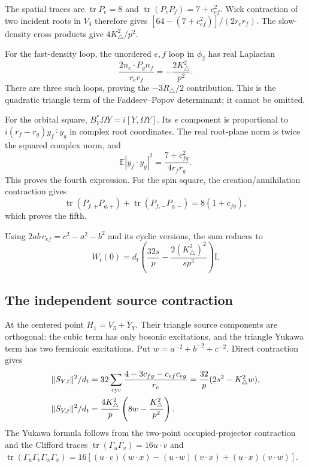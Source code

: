 \documentclass[11pt,letterpaper]{article}
\newcommand{\tr}{\operatorname{tr}}
\newcommand{\E}{\mathbb E}
\newcommand{\Id}{\mathrm I}
\begin{document}
The spatial traces are $\tr P_e=8$ and $\tr(P_eP_f)=7+c_{ef}^2$. Wick contraction of two incident roots in $V_4$ therefore gives
$[64-(7+c_{ef}^2)]/(2r_er_f)$. The slow-density cross products give $4K_\triangle^2/p^2$.

For the fast-density loop, the unordered $e,f$ loop in $\phi_2$ has real Laplacian
\[
 \frac{2n_e\cdot P_gn_f}{r_er_f}=-\frac{2K_\triangle^2}{p^2}.
\]
There are three such loops, proving the $-3R_\triangle/2$ contribution. This is the quadratic triangle term of the Faddeev--Popov determinant; it cannot be omitted.

For the orbital square, $B_Y^*\Omega Y=i[Y,\Omega Y]$. Its $e$ component is proportional to $i(r_f-r_g)\overline{y_f\cdot y_g}$ in complex root coordinates. The real root-plane norm is twice the squared complex norm, and
\[
 \E|y_f\cdot y_g|^2=\frac{7+c_{fg}^2}{4r_fr_g}.
\]
This proves the fourth expression. For the spin square, the creation/annihilation contraction gives
\[
 \tr(P_{f,+}P_{g,+})+\tr(P_{f,-}P_{g,-})=8(1+c_{fg}),
\]
which proves the fifth.

Using $2ab\,c_{ef}=c^2-a^2-b^2$ and its cyclic versions, the sum reduces to
\begin{equation}
 \boxed{\quad W_t(0)=d_t\left(\frac{32s}{p}
          -\frac{2(K_\triangle^2)^2}{s p^3}\right)\Id.\quad} \label{eq:Wt}
\end{equation}

\subsection{The independent source contraction}
At the centered point $H_1=V_3+Y_Y$. Their triangle source components are orthogonal: the cubic term has only bosonic excitations, and the triangle Yukawa term has two fermionic excitations. Put $w=a^{-2}+b^{-2}+c^{-2}$. Direct contraction gives
\begin{align}
 \|S_{Y,t}\|^2/d_t
 &=32\sum_{\rm cyc}\frac{4-3c_{fg}-c_{ef}c_{eg}}{r_e}
   =\frac{32}{p}(2s^2-K_\triangle^2w), \label{eq:yuktri}\\
 \|S_{V,t}\|^2/d_t
 &=\frac{4K_\triangle^2}{p}
           \left(8w-\frac{K_\triangle^2}{p^2}\right). \label{eq:cubictri}
\end{align}
The Yukawa formula follows from the two-point occupied-projector contraction and the Clifford traces
$\tr(\Gamma_u\Gamma_v)=16u\cdot v$ and
$\tr(\Gamma_u\Gamma_v\Gamma_w\Gamma_x)=16[(u\cdot v)(w\cdot x)-(u\cdot w)(v\cdot x)+(u\cdot x)(v\cdot w)]$.
\end{document}
